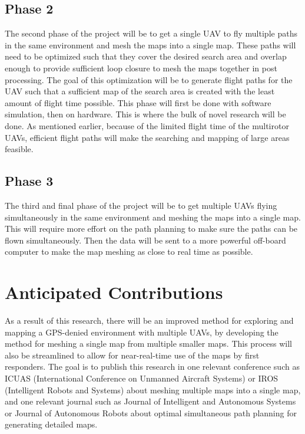 \documentclass[12pt, letterpaper]{article}
\begin{document}
\subsection{Phase 2}
The second phase of the project will be to get a single UAV to fly multiple paths in the same environment and mesh the maps into a single map. These paths will need to be optimized such that they cover the desired search area and overlap enough to provide sufficient loop closure to mesh the maps together in post processing. The goal of this optimization will be to generate flight paths for the UAV such that a sufficient map of the search area is created with the least amount of flight time possible. This phase will first be done with software simulation, then on hardware. This is where the bulk of novel research will be done. As mentioned earlier, because of the limited flight time of the multirotor UAVs, efficient flight paths will make the searching and mapping of large areas feasible.

\subsection{Phase 3}
The third and final phase of the project will be to get multiple UAVs flying simultaneously in the same environment and meshing the maps into a single map. This will require more effort on the path planning to make sure the paths can be flown simultaneously. Then the data will be sent to a more powerful off-board computer to make the map meshing as close to real time as possible. 


\section{Anticipated Contributions}

As a result of this research, there will be an improved method for exploring and mapping a GPS-denied environment with multiple UAVs, by developing the method for meshing a single map from multiple smaller maps. This process will also be streamlined to allow for near-real-time use of the maps by first responders. The goal is to publish this research in one relevant conference such as ICUAS (International Conference on Unmanned Aircraft Systems) or IROS (Intelligent Robots and Systems) about meshing multiple maps into a single map, and one relevant journal such as Journal of Intelligent and Autonomous Systems or Journal of Autonomous Robots about optimal simultaneous path planning for generating detailed maps. 

\pagebreak



\end{document}
